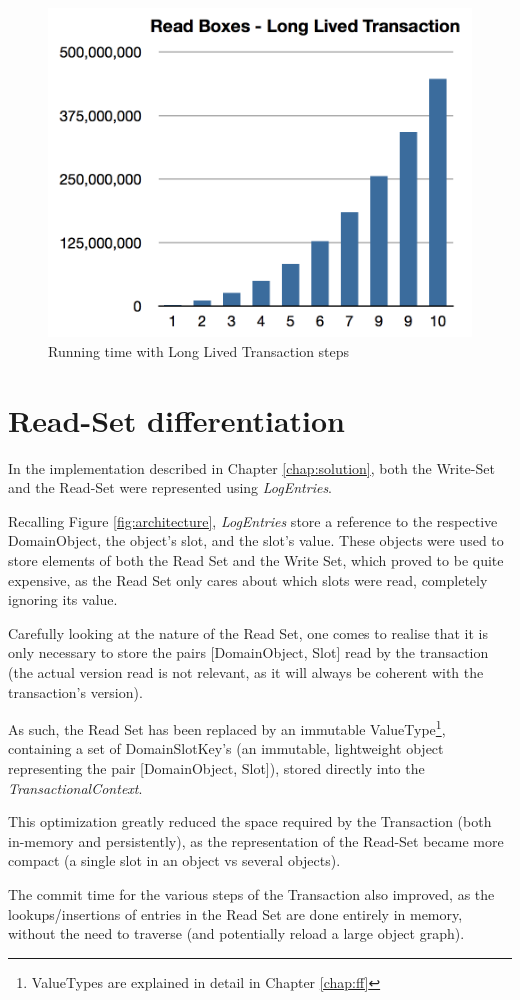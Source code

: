 \begin{figure}
\centering
\includegraphics[width=0.6\linewidth]{long-box-v1}
\caption{Running time with Long Lived Transaction steps}
\end{figure}

\section{Read-Set differentiation}

In the implementation described in Chapter \ref{chap:solution}, both
the Write-Set and the Read-Set were represented using {\it LogEntries}.

Recalling Figure \ref{fig:architecture}, {\it LogEntries} store a
reference to the respective DomainObject, the object's slot, and the
slot's value. These objects were used to store elements of both the
Read Set and the Write Set, which proved to be quite expensive, as the
Read Set only cares about which slots were read, completely
ignoring its value.

Carefully looking at the nature of the Read Set, one comes to realise
that it is only necessary to store the pairs [DomainObject, Slot] read
by the transaction (the actual version read is not relevant, as it
will always be coherent with the transaction's version).

As such, the Read Set has been replaced by an immutable
ValueType\footnote{ValueTypes are explained in detail in Chapter
  \ref{chap:ff}}, containing a set of DomainSlotKey's (an immutable,
lightweight object representing the pair [DomainObject, Slot]), stored
directly into the {\it TransactionalContext}.

This optimization greatly reduced the space required by the
Transaction (both in-memory and persistently), as the representation
of the Read-Set became more compact (a single slot in an object vs
several objects).

The commit time for the various steps of the Transaction also
improved, as the lookups/insertions of entries in the Read Set are
done entirely in memory, without the need to traverse (and
potentially reload a large object graph).


